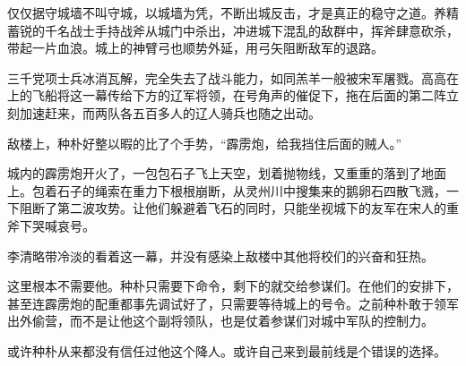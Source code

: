 仅仅据守城墙不叫守城，以城墙为凭，不断出城反击，才是真正的稳守之道。养精蓄锐的千名战士手持战斧从城门中杀出，冲进城下混乱的敌群中，挥斧肆意砍杀，带起一片血浪。城上的神臂弓也顺势外延，用弓矢阻断敌军的退路。 

三千党项士兵冰消瓦解，完全失去了战斗能力，如同羔羊一般被宋军屠戮。高高在上的飞船将这一幕传给下方的辽军将领，在号角声的催促下，拖在后面的第二阵立刻加速赶来，而两队各五百多人的辽人骑兵也随之出动。 

敌楼上，种朴好整以暇的比了个手势，“霹雳炮，给我挡住后面的贼人。” 

城内的霹雳炮开火了，一包包石子飞上天空，划着抛物线，又重重的落到了地面上。包着石子的绳索在重力下根根崩断，从灵州川中搜集来的鹅卵石四散飞溅，一下阻断了第二波攻势。让他们躲避着飞石的同时，只能坐视城下的友军在宋人的重斧下哭喊哀号。 

李清略带冷淡的看着这一幕，并没有感染上敌楼中其他将校们的兴奋和狂热。 

这里根本不需要他。种朴只需要下命令，剩下的就交给参谋们。在他们的安排下，甚至连霹雳炮的配重都事先调试好了，只需要等待城上的号令。之前种朴敢于领军出外偷营，而不是让他这个副将领队，也是仗着参谋们对城中军队的控制力。 

或许种朴从来都没有信任过他这个降人。或许自己来到最前线是个错误的选择。 



